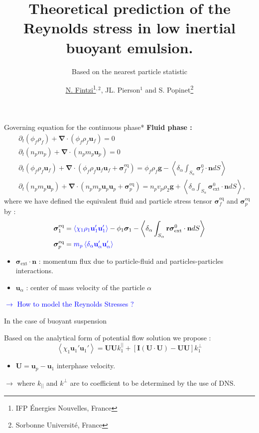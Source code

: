 \documentclass{sintefbeamer}
\title{Theoretical prediction of the Reynolds stress in low inertial buoyant emulsion.}
\subtitle{Based on the nearest particle statistic}
\author{\href{http://basilisk.fr/sandbox/fintzin/Rising-Suspenion/RS.c}{\underline{N. Fintzi}\footnote{IFP \'Energies Nouvelles, France}$^{,2}$}, JL. Pierson$^1$ and S. Popinet\footnote{Sorbonne Universit\'e, France}}
\newcommand{\avg}[1]{\left<#1\right>}
\newcommand{\pavg}[1]{\left<\delta_\alpha #1\right>}
\newcommand{\pddt}{\partial_t}
\renewcommand{\div}{\mathbf{\nabla}\cdot}
\newcommand{\tb}[1]{\textcolor{blue}{#1}}
\newcommand{\intS}[1]{\int_{S_\alpha} #1 dS}
\newcommand{\pSavg}[1]{\pavg{\intS{#1}}}
\begin{document}
\maketitle

\begin{frame}
  {Governing equation for the continuous phase}*
  \small
  \textbf{Fluid phase :}
  \begin{align*}
    &\pddt (\phi_f \rho_f)  
    + \div (
        \phi_f \rho_f\textbf{u}_f
    )
    = 
    0\\
    &\pddt \left(n_p m_p\right)
    + \div \left(n_pm_p\textbf{u}_p
    \right)
    = 
    0\\
    &\pddt (\phi_f \rho_f\textbf{u}_f)  
    + \div (
        \phi_f \rho_f\textbf{u}_f\textbf{u}_f
        + \bm{\sigma}_f^\text{eq}
    )
    = 
    \phi_f \rho_f \textbf{g} 
    - \pSavg{{\bm{\sigma}_f^0 \cdot \textbf{n}}}\\
    &\pddt \left(n_p m_p \textbf{u}_p\right)
    + \div \left(n_p
    m_p \textbf{u}_p \textbf{u}_p 
    + \bm{\sigma}_p^\text{eq}
    \right)
    = 
    n_p v_p \rho_2 \textbf{g}
    + \pSavg{{\bm{\sigma}_\text{ext}^0 \cdot \textbf{n}}},
\end{align*} 
where we have defined the equivalent fluid and particle stress tensor $\bm{\sigma}_f^\text{eq}$ and $\bm{\sigma}_p^\text{eq}$ by : 
\begin{align*}
    &\bm{\sigma}_1^\text{eq}
    = 
    \tb{\avg{\chi_1\rho_1\textbf{u}_1'\textbf{u}_1'}}
    - \phi_1 \bm{\sigma}_1%
    - \pSavg{{\textbf{r}\bm{\sigma}_\text{ext}^0 \cdot \textbf{n}}}\\
    &\bm{\sigma}_p^\text{eq}
    =  \tb{m_p\pavg{\textbf{u}_\alpha'\textbf{u}_\alpha'}}
\end{align*}
\begin{itemize}
  \item $\bm{\sigma}_\text{ext} \cdot \textbf{n}$ : momentum flux due to particle-fluid and particles-particles interactions. 
  \item $\textbf{u}_\alpha$ : center of mass velocity of the particle $\alpha$
\end{itemize}
\tb{$\to$ How to model the Reynolds Stresses ? }
\end{frame}

\begin{frame}
  {In the case of buoyant suspension}

  Based on the analytical form of potential flow solution we propose :
  \begin{equation*}
    \avg{\chi_1 \textbf{u}_1'\textbf{u}_1'}
    = 
    \textbf{U}
    \textbf{U}
    k^{||}_1
    + 
    \left[
        \textbf{I} (\textbf{U}\cdot \textbf{U})
    -
    \textbf{U}
    \textbf{U}
    \right]
    k^{\bot}_1
\end{equation*}
\begin{itemize}
  \item $\textbf{U} = \textbf{u}_p - \textbf{u}_1$ interphase velocity. 
\end{itemize}
$\to$ where $k_{||}$ and $k^\bot$ are to coefficient to be determined by the use of DNS. 
\end{frame}
\end{document}
